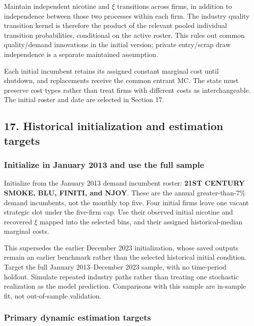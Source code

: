 \documentclass[10pt,]{article}
\begin{document}
Maintain independent nicotine and \(\xi\) transitions across firms, in
addition to independence between those two processes within each firm.
The industry quality transition kernel is therefore the product of the
relevant pooled individual transition probabilities, conditional on the
active roster. This rules out common quality/demand innovations in the
initial version; private entry/scrap draw independence is a separate
maintained assumption.

Each initial incumbent retains its assigned constant marginal cost until
shutdown, and replacements receive the common entrant MC. The state must
preserve cost types rather than treat firms with different costs as
interchangeable. The initial roster and date are selected in Section 17.

\subsection{17. Historical initialization and estimation
targets}\label{historical-initialization-and-estimation-targets}

\subsubsection{Initialize in January 2013 and use the full
sample}\label{initialize-in-january-2013-and-use-the-full-sample}

Initialize from the January 2013 demand incumbent roster: \textbf{21ST
CENTURY SMOKE, BLU, FINITI, and NJOY}. These are the annual
greater-than-7\% demand incumbents, not the monthly top five. Four
initial firms leave one vacant strategic slot under the five-firm cap.
Use their observed initial nicotine and recovered \(\xi\) mapped into
the selected bins, and their assigned historical-median marginal costs.

This supersedes the earlier December 2023 initialization, whose saved
outputs remain an earlier benchmark rather than the selected historical
initial condition. Target the full January 2013--December 2023 sample,
with no time-period holdout. Simulate repeated industry paths rather
than treating one stochastic realization as the model prediction.
Comparisons with this sample are in-sample fit, not out-of-sample
validation.

\subsubsection{Primary dynamic estimation
targets}\label{primary-dynamic-estimation-targets}
\end{document}
